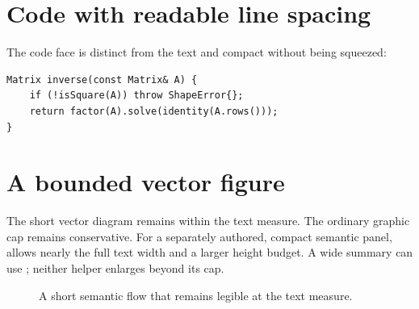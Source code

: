 \documentclass[11pt,twoside,openany]{book}
\begin{document}
\section{Code with readable line spacing}
The code face is distinct from the text and compact without being squeezed:
\begin{Shaded}
\begin{Verbatim}[fontsize=\small]
Matrix inverse(const Matrix& A) {
    if (!isSquare(A)) throw ShapeError{};
    return factor(A).solve(identity(A.rows()));
}
\end{Verbatim}
\end{Shaded}

\section{A bounded vector figure}
The short vector diagram remains within the text measure. The ordinary graphic cap remains conservative. For a separately authored, compact semantic panel, \texttt{\string\BookDiagramPanel} allows nearly the full text width and a larger height budget. A wide summary can use \texttt{\string\BookDiagramWide}; neither helper enlarges beyond its cap.
\begin{figure}[htbp]
\centering
{}
\caption{A short semantic flow that remains legible at the text measure.}
\end{figure}
\end{document}
